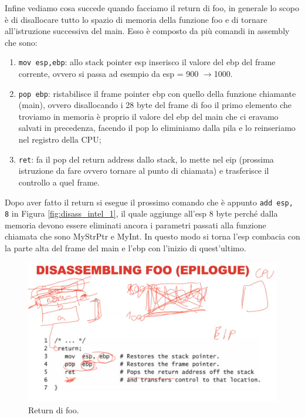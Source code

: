 Infine vediamo cosa succede quando facciamo il return di foo, in generale lo scopo
è di disallocare tutto lo spazio di memoria della funzione foo e di tornare
all'istruzione successiva del main. Esso è composto da più comandi in assembly che sono:

\begin{enumerate}
    \item \verb|mov esp,ebp|: allo stack pointer esp inserisco il valore del ebp del
          frame corrente, ovvero si passa ad esempio da esp = 900 $\rightarrow$1000.
    \item \verb|pop ebp|: ristabilisce il frame pointer ebp con quello della funzione
          chiamante (main), ovvero disallocando i 28 byte del frame di foo il primo
          elemento che troviamo in memoria è proprio il valore del ebp del main che ci
          eravamo salvati in precedenza, facendo il pop lo eliminiamo dalla pila e lo
          reinseriamo nel registro della CPU;
    \item \verb|ret|: fa il pop del return address dallo stack, lo mette nel
          eip (prossima istruzione da fare ovvero tornare al punto di chiamata) e
          trasferisce il controllo a quel frame.
\end{enumerate}

Dopo aver fatto il return si esegue il prossimo comando che è appunto \verb|add esp, 8|
in Figura \ref{fig:disass_intel_1}, il quale aggiunge all'esp 8 byte perché dalla
memoria devono essere eliminati ancora i parametri passati alla funzione chiamata
che sono MyStrPtr e MyInt. In questo modo si torna l'esp combacia con la parte alta
del frame del main e l'ebp con l'inizio di quest'ultimo.

\begin{figure}[H]
    \centering
    \includegraphics[width=13cm, keepaspectratio]{capitoli/secure_coding/img/cap_2/disass_intel_3.png}
    \caption{Return di foo.}\label{fig:disass_intel_3}
\end{figure}


